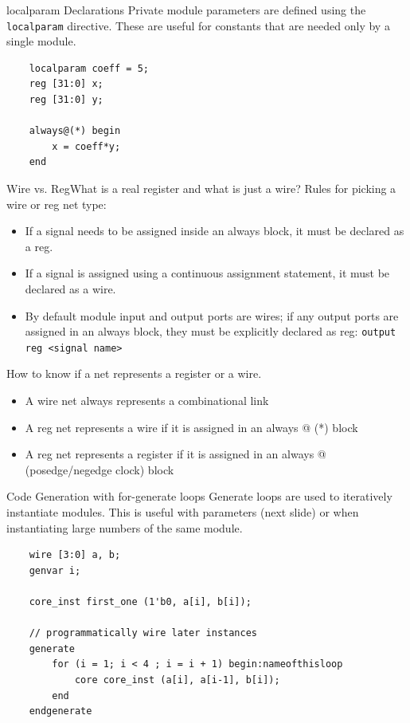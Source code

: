 \documentclass{beamer}
\begin{document}
\begin{frame}[fragile]{localparam Declarations}
	Private module parameters are defined using the \texttt{localparam} directive.
	These are useful for constants that are needed only by a single module.

\begin{verbatim}
	localparam coeff = 5;
	reg [31:0] x;
	reg [31:0] y;

	always@(*) begin
		x = coeff*y;
	end

\end{verbatim}

\end{frame}

\begin{frame}[fragile]{Wire vs. Reg}{What is a real register and what is just a wire?}
	Rules for picking a wire or reg net type:
	\begin{itemize}
		\item If a signal needs to be assigned inside an always block, it must be declared as a reg.
		\item If a signal is assigned using a continuous assignment statement, it must be declared as a wire.
		\item By default module input and output ports are wires; if any output ports are assigned in an always block, they must be explicitly declared as reg: \texttt{output reg <signal name>}
	\end{itemize}
	
	How to know if a net represents a register or a wire.
	\begin{itemize}
		\item A wire net always represents a combinational link
		\item A reg net represents a wire if it is assigned in an always @ (*) block
		\item A reg net represents a register if it is assigned in an always @ (posedge/negedge clock) block
	\end{itemize}
\end{frame}

\begin{frame}[fragile]{Code Generation with for-generate loops}
	Generate loops are used to iteratively instantiate modules.
	This is useful with parameters (next slide) or when instantiating large numbers of the same module.

	\begin{verbatim}
	wire [3:0] a, b;
	genvar i;

	core_inst first_one (1'b0, a[i], b[i]);

	// programmatically wire later instances
	generate
		for (i = 1; i < 4 ; i = i + 1) begin:nameofthisloop
			core core_inst (a[i], a[i-1], b[i]);
		end
	endgenerate
	\end{verbatim}

\end{frame}
\end{document}
